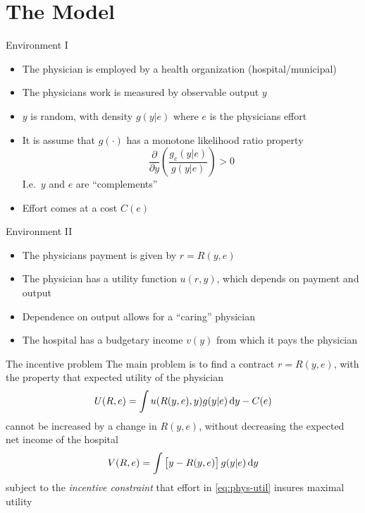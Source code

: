 \documentclass[compress, handout]{beamer}
\begin{document}
\section{The Model}
    
\begin{frame}[c]{Environment I}
\begin{itemize}[<+- | alert@+>]
  \item The physician is employed by a health organization (hospital/municipal)
  \item The physicians work is measured by observable output $y$
  \item $y$ is random, with density $g(y|e)$ where $e$ is the physicians effort
  \item It is assume that $g(\cdot)$ has a monotone likelihood ratio property
  \[
    \frac{\partial}{\partial y}\left(\frac{g_e(y|e)}{g(y|e)}\right)>0
  \]
  I.e.\ $y$ and $e$ are ``complements''
  \item Effort comes at a cost $C(e)$
\end{itemize}
\end{frame}

\begin{frame}[c]{Environment II}
\begin{itemize}[<+- | alert@+>]
  \item The physicians payment is given by $r=R(y,e)$
  \item The physician has a utility function $u(r,y)$, which depends on payment and output
  \item Dependence on output allows for a ``caring'' physician
  \item The hospital has a budgetary income $v(y)$ from which it pays the physician
\end{itemize}
\end{frame}

\begin{frame}[c]{The incentive problem}
  The main problem is to find a contract $r=R(y,e)$, with the property that expected utility of the physician
  \begin{align}
       U(R,e)=\int u(R(y,e),y)g(y|e)\dif y-C(e) \label{eq:phys-util}
  \end{align}
  cannot be increased by a change in $R(y,e)$, without decreasing the expected net income of the hospital
  \[
    V(R,e)=\int \left[y-R(y,e)\right] g(y|e)\dif y
  \]
  subject to the \emph{incentive constraint} that effort in \cref{eq:phys-util} insures maximal utility
\end{frame}
\end{document}
